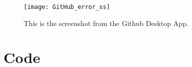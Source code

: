 \documentclass[11pt]{article}
\newcommand{\Verilog}[2][]{%
	
}
\begin{document}
\begin{figure}[ht]\centering
	\texttt{[image: GitHub\_error\_ss]}
	\caption{This is the screenshot from the Github Desktop App.}
	\label{fig:GitHub_error_ss}
\end{figure}

\section*{}
\section*{}
\section*{}
\section*{}
\section*{}
\section*{}

\section*{Code}

\Verilog[caption=File-included Verilog code example,label=code:file_ex]{lab1_example_code.sv}
\end{document}
